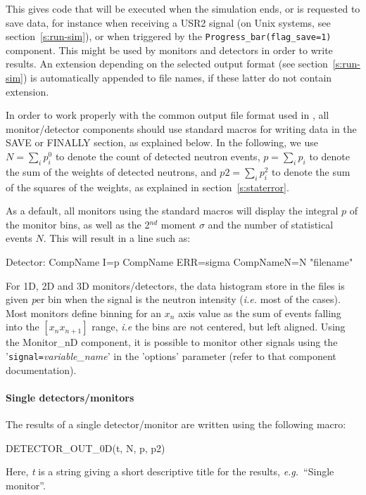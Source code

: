 This gives code that will be executed when the simulation ends, or is requested
to save data, for instance when receiving a USR2 signal (on Unix systems, see
section~\ref{s:run-sim}), or when triggered by the
\texttt{Progress\_bar(flag\_save=1)} component.  This might be used by monitors
and detectors in order to write results.  An extension depending on the selected
output format (see section~\ref{s:run-sim}) is
automatically appended to file names, if these latter do not contain extension.

In order to work properly with the common output file format used in
\MCS, all monitor/detector components should use standard macros for
writing data in the SAVE or FINALLY section, as explained below. In the
following, we use $N = \sum_i p_i^0$ to denote the count of detected
neutron events, $p = \sum_i p_i$ to denote the sum of the weights of
detected neutrons, and $\textit{p2} = \sum_i p_i^2$ to denote the sum of
the squares of the weights, as explained in section~\ref{s:staterror}.

As a default, all monitors using the standard macros will display the
integral $p$ of the monitor bins, as well as the 2$^{nd}$ moment $\sigma$
and the number of statistical events $N$. This will result in a line such as:

\begin{mcstas}
Detector: CompName I=p CompName ERR=sigma CompNameN=N "filename"
\end{mcstas}


For 1D, 2D and 3D monitors/detectors, the data histogram store in the files is
given {\emph per bin} when the signal is the neutron intensity (\textit{i.e.} most
of the cases). Most monitors define binning for an $x_n$ axis value as the sum
of events falling into the $[ x_n x_{n+1} ]$ range, \textit{i.e} the bins are
{\emph not} centered, but left aligned.  Using the Monitor\_nD component, it is
possible to monitor other signals using the '\verb+signal=+\textit{variable\_name}'
in the 'options' parameter (refer to that component documentation).

\paragraph{Single detectors/monitors}
\label{s:DETECTOR_OUT}

The results of a single detector/monitor are written using the following
macro:
\begin{mcstas}
DETECTOR_OUT_0D(t, N, p, p2)
\end{mcstas}
Here, \textit{t} is a string giving a short descriptive title for the
results, {\em e.g.}\ ``Single monitor''.


